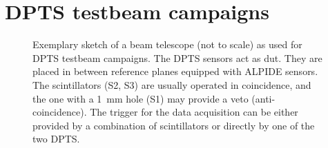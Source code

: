 %
\section{DPTS testbeam campaigns}
\label{sec:testbeams}
%


\begin{figure}[!htb]
	\centering
    
    \caption[Exemplary sketch of a beam telescope as used for DPTS testbeam campaigns]{Exemplary sketch of a beam telescope (not to scale) as used for DPTS testbeam campaigns. The DPTS sensors act as \gls{dut}. They are placed in between reference planes equipped with ALPIDE sensors. The scintillators (S2, S3) are usually operated in coincidence, and the one with a \qty{1}{\mm} hole (S1) may provide a veto (anti-coincidence). The trigger for the data acquisition can be either provided by a combination of scintillators or directly by one of the two DPTS.}
    \label{fig:testbeam-setup}
\end{figure}